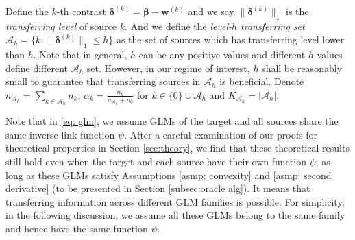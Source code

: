 \documentclass[12pt]{article}
\newcommand{\bdeltak}[1]{\bm{\delta}^{(#1)}}
\newcommand{\onenorm}[1]{\|#1\|_{1}}
\newcommand{\bbeta}{\bm{\beta}}
\newcommand{\bwk}[1]{\bm{w}^{(#1)}}
\newcommand{\mah}{\mathcal{A}_h}
\newcommand{\nah}{n_{\mathcal{A}_h}}
\newcommand{\Kah}{K_{\mah}}
\newcommand{\<}{\langle}
\renewcommand{\>}{\rangle}
\begin{document}
Define the $k$-th contrast $\bdeltak{k} = \bbeta - \bwk{k}$ and we say $\onenorm{\bdeltak{k}}$ is the \textit{transferring level} of source $k$. And we define the \textit{level-$h$ transferring set} $\mah = \{k: \onenorm{\bdeltak{k}} \leq h\}$ as the set of sources which has transferring level lower than $h$. Note that in general, $h$ can be any positive values and different $h$ values define different $\mah$ set. However, in our regime of interest, $h$ shall be reasonably small to guarantee that transferring sources in $\mah$ is beneficial. Denote $\nah = \sum_{k \in \mah}n_k$, $\alpha_k = \frac{n_k}{\nah + n_0}$ for $k \in \{0\}\cup \mah$ and $\Kah = |\mah|$.

Note that in \eqref{eq: glm}, we assume GLMs of the target and all sources share the same inverse link function $\psi$. After a careful examination of our proofs for theoretical properties in Section \ref{sec:theory}, we find that these theoretical results still hold even when the target and each source have their own function $\psi$, as long as these GLMs satisfy Assumptions \ref{asmp: convexity} and \ref{asmp: second derivative} (to be presented in Section \ref{subsec:oracle alg}). It means that transferring information across different GLM families is possible. For simplicity, in the following discussion, we assume all these GLMs belong to the same family and hence have the same function $\psi$.


\end{document}
